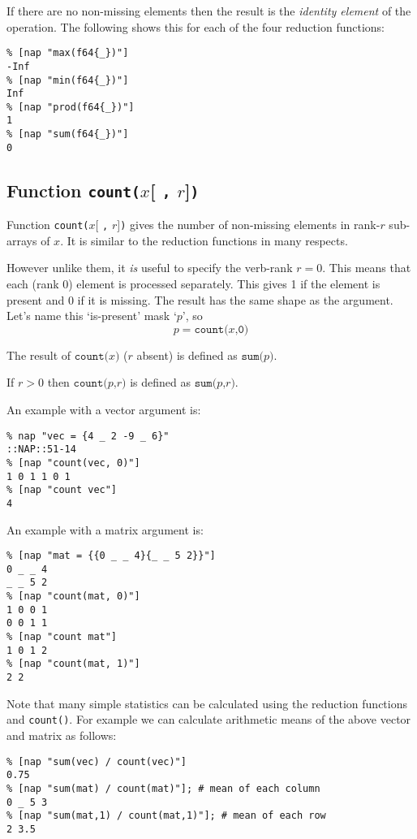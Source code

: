 If there are no non-missing elements then the result is the
\emph{identity element} of the operation.
The following shows this for each of the four reduction functions:
\begin{verbatim}
% [nap "max(f64{_})"]
-Inf
% [nap "min(f64{_})"]
Inf
% [nap "prod(f64{_})"]
1
% [nap "sum(f64{_})"]
0
\end{verbatim}

\subsection{Function \texttt{count(}$x$[ \texttt{,} $r$]\texttt{)}}
\label{function-count}

Function \texttt{count(}$x$[ \texttt{,} $r$]\texttt{)}
gives the number of non-missing elements in rank-$r$ sub-arrays of $x$.
It is similar to the reduction functions in many respects.

However unlike them, it \emph{is} useful to specify the verb-rank $r=0$.
This means that each (rank 0) element is processed separately.
This gives 1 if the element is present and 0 if it is missing.
The result has the same shape as the argument.
Let's name this `is-present' mask `$p$', so
\[ p = \texttt{count(}x\texttt{,0)} \]

The result of
$\texttt{count(}x\texttt{)}$
($r$ absent)
is defined as
$\texttt{sum(}p\texttt{)}$.

If $r>0$ then
$\texttt{count(}p\texttt{,}r\texttt{)}$
is defined as
$\texttt{sum(}p\texttt{,}r\texttt{)}$.

An example with a vector argument is:
\begin{verbatim}
% nap "vec = {4 _ 2 -9 _ 6}"
::NAP::51-14
% [nap "count(vec, 0)"]
1 0 1 1 0 1
% [nap "count vec"]
4
\end{verbatim}

An example with a matrix argument is:
\begin{verbatim}
% [nap "mat = {{0 _ _ 4}{_ _ 5 2}}"]
0 _ _ 4
_ _ 5 2
% [nap "count(mat, 0)"]
1 0 0 1
0 0 1 1
% [nap "count mat"]
1 0 1 2
% [nap "count(mat, 1)"]
2 2
\end{verbatim}

Note that many simple statistics can be calculated using the reduction
functions and \texttt{count()}.
For example we can calculate arithmetic means of the above vector and
matrix as follows:

\begin{verbatim}
% [nap "sum(vec) / count(vec)"]
0.75
% [nap "sum(mat) / count(mat)"]; # mean of each column
0 _ 5 3
% [nap "sum(mat,1) / count(mat,1)"]; # mean of each row
2 3.5
\end{verbatim}


